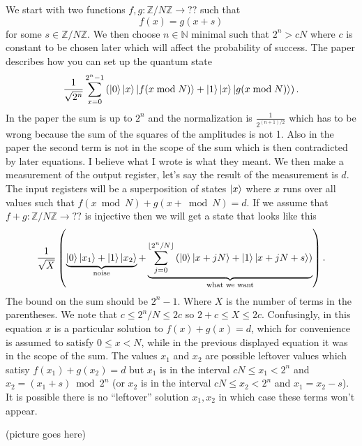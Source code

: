 \documentclass[10pt]{article}
\theoremstyle{plain}
\theoremstyle{definition}
\newcommand{\N}{\mathbb{N}}
\newcommand{\Z}{\mathbb{Z}}
\begin{document}
We start with two functions \( f, g: \Z / N\Z \to ?? \) such that
\[
    f(x) = g(x+s)
\]
for some \( s \in \Z / N\Z \).
We then choose \( n \in \N \) minimal such that \( 2^n > cN \) where \( c \) is constant to be chosen later which will affect the probability of success. The paper describes how you can set up the quantum state
\[
    \frac{1}{\sqrt{2^{n}}} \sum_{x=0}^{2^n-1} \left( \ket{0}\ket{x}\ket{f(x \bmod{N})} + \ket{1}\ket{x}\ket{g(x \bmod{N})} \right).
\]
{
\color{red} In the paper the sum is up to \( 2^n \) and the normalization is \( \frac{1}{2^{(n+1) / 2}} \) which has to be wrong because the sum of the squares of the amplitudes is not 1.
Also in the paper the second term is not in the scope of the sum which is then contradicted by later equations.
I believe what I wrote is what they meant.
}
We then make a measurement of the output register, let's say the result of the measurement is \( d \). The input registers will be a superposition of states \( \ket{x} \) where \( x \) runs over all values such that \( f(x \bmod{N}) + g(x + \bmod{N}) = d\). If we assume that \( f+g : \Z / N\Z \to ?? \) is injective then we will get a state that looks like this
\[
    \frac{1}{\sqrt{X}}
    \left(
    \underbrace{\ket{0}\ket{x_1} + \ket{1}\ket{x_2}}_{\text{noise}} +
    \underbrace{\sum_{j=0}^{\lfloor 2^n / N \rfloor }
        \left(
        \ket{0}\ket{x + jN}+ \ket{1}\ket{x + jN + s} \right)}_{\text{what we want}}
    \right).
\]
{
\color{red} The bound on the sum should be \( 2^n - 1 \).
}
Where \( X \) is the number of terms in the parentheses.
We note that \( c \leq 2^n / N \leq 2c \) so \( 2+c \leq X \leq 2c \).
Confusingly, in this equation \( x \) is a particular solution to \( f(x) + g(x) = d \), which for convenience is assumed to satisfy \( 0 \leq x < N \), while in the previous displayed equation it was in the scope of the sum.
The values \( x_1 \) and \( x_2 \) are possible leftover values which satisy \( f(x_1) + g(x_2) = d \) but \( x_1 \) is in the interval \( cN \leq x_1 < 2^n  \) and \( x_2 = (x_1 + s) \bmod{2^n} \) (or \( x_2 \) is in the interval \( cN \leq x_2 < 2^n  \) and \( x_1 = x_2 - s \)).
It is possible there is no ``leftover'' solution \( x_1, x_2 \) in which case these terms won't appear.

\begin{center}
    (picture goes here)
\end{center}
\end{document}
